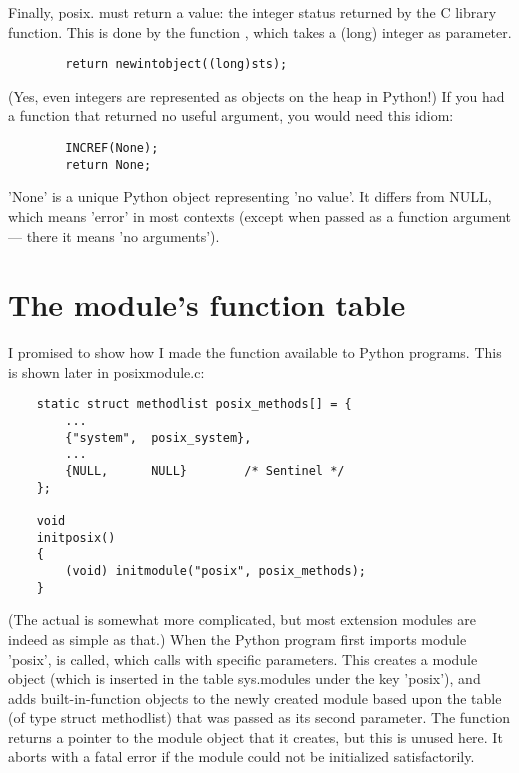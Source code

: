 Finally, posix. must return a value: the integer status
returned by the C library  function.  This is done by the
function , which takes a (long) integer as parameter.

\begin{verbatim}
        return newintobject((long)sts);
\end{verbatim}

(Yes, even integers are represented as objects on the heap in Python!)
If you had a function that returned no useful argument, you would need
this idiom:

\begin{verbatim}
        INCREF(None);
        return None;
\end{verbatim}

'None' is a unique Python object representing 'no value'.  It differs
from NULL, which means 'error' in most contexts (except when passed as
a function argument --- there it means 'no arguments').


\section{The module's function table}

I promised to show how I made the function 
available to Python programs.  This is shown later in posixmodule.c:

\begin{verbatim}
    static struct methodlist posix_methods[] = {
        ...
        {"system",  posix_system},
        ...
        {NULL,      NULL}        /* Sentinel */
    };

    void
    initposix()
    {
        (void) initmodule("posix", posix_methods);
    }
\end{verbatim}

(The actual  is somewhat more complicated, but most
extension modules are indeed as simple as that.)  When the Python
program first imports module 'posix',  is called,
which calls  with specific parameters.  This
creates a module object (which is inserted in the table sys.modules
under the key 'posix'), and adds built-in-function objects to the
newly created module based upon the table (of type struct methodlist)
that was passed as its second parameter.  The function
 returns a pointer to the module object that it
creates, but this is unused here.  It aborts with a fatal error if the
module could not be initialized satisfactorily.


